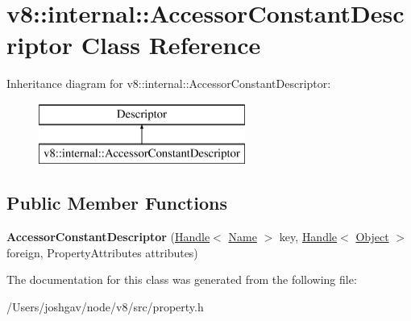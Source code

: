 \hypertarget{classv8_1_1internal_1_1_accessor_constant_descriptor}{}\section{v8\+:\+:internal\+:\+:Accessor\+Constant\+Descriptor Class Reference}
\label{classv8_1_1internal_1_1_accessor_constant_descriptor}
Inheritance diagram for v8\+:\+:internal\+:\+:Accessor\+Constant\+Descriptor\+:\begin{figure}[H]
\begin{center}
\leavevmode
\includegraphics[height=2.000000cm]{classv8_1_1internal_1_1_accessor_constant_descriptor}
\end{center}
\end{figure}
\subsection*{Public Member Functions}
\begin{DoxyCompactItemize}
\item 
{\bfseries Accessor\+Constant\+Descriptor} (\hyperlink{classv8_1_1internal_1_1_handle}{Handle}$<$ \hyperlink{classv8_1_1internal_1_1_name}{Name} $>$ key, \hyperlink{classv8_1_1internal_1_1_handle}{Handle}$<$ \hyperlink{classv8_1_1internal_1_1_object}{Object} $>$ foreign, Property\+Attributes attributes)\hypertarget{classv8_1_1internal_1_1_accessor_constant_descriptor_af3252e5d188b9614d30566194b2bedb6}{}\label{classv8_1_1internal_1_1_accessor_constant_descriptor_af3252e5d188b9614d30566194b2bedb6}

\end{DoxyCompactItemize}


The documentation for this class was generated from the following file\+:\begin{DoxyCompactItemize}
\item 
/\+Users/joshgav/node/v8/src/property.\+h\end{DoxyCompactItemize}
